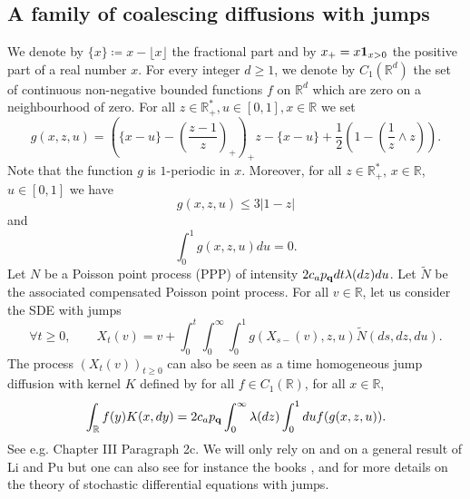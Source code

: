 \documentclass[11pt]{article}
\numberwithin{equation}{section}
\def \R{\mathbb {R}}
\begin{document}
\subsection{A family of coalescing diffusions with jumps}\label{sous-section coalescent continu}
We denote by $\{x\}\coloneqq x- \lfloor x \rfloor $ the fractional part and by $x_+ = x {\bf 1}_{x>0}$ the positive part of a real number $x$. For every integer $d\ge 1$, we denote by $C_1(\R^d)$ the set of continuous non-negative bounded functions $f$ on $\R^d$ which are zero on a neighbourhood of zero.
For all $z \in \R^*_+, u \in [0,1], x \in \R$ we set
$$
g(x,z,u) =  \left( \{x-u\} - \left( \frac{z-1}{z}\right)_+\right)_+ z %
 - \{x-u\}
 +\frac{1}{2} \left( 1-\left(\frac{1}{z}\wedge z\right) \right).
$$
Note that the function $g$ is $1$-periodic in $x$. Moreover, for all $z \in \R_+^*$, $x \in \R$, $u\in [0,1]$ we have 
\begin{equation}\label{eq majoration g}
	g(x,z,u)\le 3\vert 1-z\vert
\end{equation} 
and
\begin{equation}\label{eq moyenne de g nulle}
\int_0^1 g(x,z,u) du =0.
\end{equation}
Let $N$ be a Poisson point process (PPP) of intensity $2c_a p_{\bf q}dt  \lambda(dz)du$. Let $\widetilde{N}$ be the associated compensated Poisson point process. For all $v \in \R$, let us consider the SDE with jumps
\begin{equation}\label{eq EDSsauts}
\forall t \ge 0, \qquad
X_t(v) = v+ \int_0^t \int_0^\infty \int_0^1 g(X_{s-}(v),z,u) \widetilde{N}(ds,dz,du).
\end{equation}
The process $(X_t(v))_{t\ge 0}$ can also be seen as a time homogeneous jump diffusion with kernel $K$ defined by for all $f \in C_1(\R)$, for all $x \in \R$,
$$
\int_\R f(y) K(x , dy )
=
2c_a p_{\bf q}\int_0^\infty \lambda(dz) \int_0^1 du f(g(x,z,u)).
$$
See e.g.\@ \cite{JS87} Chapter III Paragraph 2c. We will only rely on \cite{JS87} and on a general result of Li and Pu \cite{LP12} but one can also see for instance the books \cite{Jac79}, \cite{IW89} and \cite{App09} for more details on the theory of stochastic differential equations with jumps. 
\end{document}
